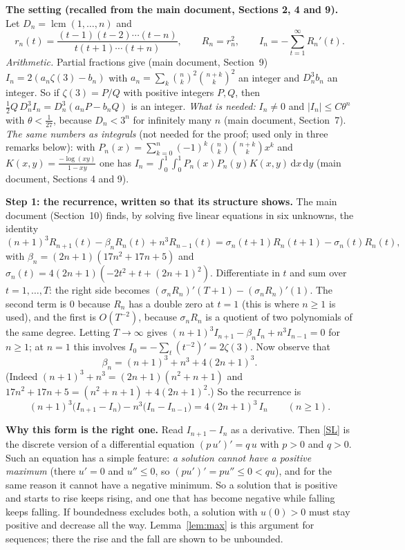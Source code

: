 \documentclass[11pt]{article}
\newcommand{\dd}{\,\mathrm d}
\DeclareMathOperator{\lcm}{lcm}
\newcommand{\q}[1]{\medskip\noindent\textbf{#1}}
\begin{document}
\q{The setting (recalled from the main document, Sections 2, 4 and 9).} Let
$D_n=\lcm(1,\dots,n)$ and
\[
r_n(t)=\frac{(t-1)(t-2)\cdots(t-n)}{t(t+1)\cdots(t+n)},\qquad R_n=r_n^2,\qquad
I_n=-\sum_{t=1}^\infty R_n'(t).
\]
\emph{Arithmetic.} Partial fractions give (main document, Section~9) $I_n=2(a_n\zeta(3)-b_n)$ with
$a_n=\sum_k\binom nk^2\binom{n+k}k^2$ an integer and $D_n^3b_n$ an integer. So if $\zeta(3)=P/Q$
with positive integers $P,Q$, then $\frac12Q\,D_n^3I_n=D_n^3(a_nP-b_nQ)$ is an integer.
\emph{What is needed:} $I_n\neq0$ and $|I_n|\le C\theta^n$ with $\theta<\frac1{27}$, because
$D_n<3^n$ for infinitely many $n$ (main document, Section~7).
\emph{The same numbers as integrals} (not needed for the proof; used only in three remarks below):
with $P_n(x)=\sum_{k=0}^n(-1)^k\binom nk\binom{n+k}kx^k$ and $K(x,y)=\frac{-\log(xy)}{1-xy}$ one has
$I_n=\int_0^1\!\!\int_0^1P_n(x)P_n(y)K(x,y)\dd x\dd y$ (main document, Sections 4 and 9).

\q{Step 1: the recurrence, written so that its structure shows.} The main document (Section~10)
finds, by solving five linear equations in six unknowns, the identity
\[
(n+1)^3R_{n+1}(t)-\beta_nR_n(t)+n^3R_{n-1}(t)=\sigma_n(t+1)R_n(t+1)-\sigma_n(t)R_n(t),
\]
with $\beta_n=(2n+1)(17n^2+17n+5)$ and $\sigma_n(t)=4(2n+1)(-2t^2+t+(2n+1)^2)$. Differentiate in
$t$ and sum over $t=1,\dots,T$: the right side becomes $(\sigma_nR_n)'(T+1)-(\sigma_nR_n)'(1)$. The
second term is $0$ because $R_n$ has a double zero at $t=1$ (this is where $n\ge1$ is used), and
the first is $O(T^{-2})$, because $\sigma_nR_n$ is a quotient of two polynomials of the same degree.
Letting $T\to\infty$ gives $(n+1)^3I_{n+1}-\beta_nI_n+n^3I_{n-1}=0$ for $n\ge1$; at $n=1$ this
involves $I_0=-\sum_t(t^{-2})'=2\zeta(3)$. Now observe that
\[
\beta_n=(n+1)^3+n^3+4(2n+1)^3 .
\]
(Indeed $(n+1)^3+n^3=(2n+1)(n^2+n+1)$ and $17n^2+17n+5=(n^2+n+1)+4(2n+1)^2$.) So the recurrence is
\begin{equation}\label{SL}
(n+1)^3\bigl(I_{n+1}-I_n\bigr)-n^3\bigl(I_n-I_{n-1}\bigr)=4(2n+1)^3\,I_n\qquad(n\ge1).
\end{equation}

\q{Why this form is the right one.} Read $I_{n+1}-I_n$ as a derivative. Then \eqref{SL} is the
discrete version of a differential equation $(p\,u')'=q\,u$ with $p>0$ and $q>0$. Such an equation
has a simple feature: \emph{a solution cannot have a positive maximum} (there $u'=0$ and
$u''\le0$, so $(pu')'=pu''\le0<qu$), and for the same reason it cannot have a negative minimum. So
a solution that is positive and starts to rise keeps rising, and one that has become negative
while falling keeps falling. If boundedness excludes both, a solution with $u(0)>0$ must stay
positive and decrease all the way. Lemma~\ref{lem:max} is this argument for sequences; there the
rise and the fall are shown to be unbounded.
\end{document}
